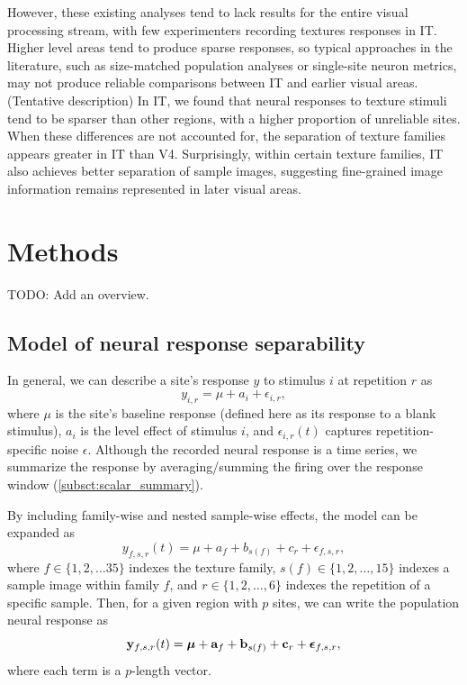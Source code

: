 \documentclass[draft]{cmustatproposal} %
\newcommand{\todo}[1]{{\color{purple}#1}}
\begin{document}
However, these existing analyses tend to lack results for the entire visual processing stream, with few experimenters recording textures responses in IT. Higher level areas tend to produce sparse responses, so typical approaches in the literature, such as size-matched population analyses or single-site neuron metrics, may not produce reliable comparisons between IT and earlier visual areas. \todo{(Tentative description) In IT, we found that neural responses to texture stimuli tend to be sparser than other regions, with a higher proportion of unreliable sites. When these differences are not accounted for, the separation of texture families appears greater in IT than V4. Surprisingly, within certain texture families, IT also achieves better separation of sample images, suggesting fine-grained image information remains represented in later visual areas.}

\section{Methods}

\todo{TODO: Add an overview.}

\subsection{Model of neural response separability}
In general, we can describe a site's response \( y \) to stimulus \( i \) at repetition \( r \) as 
\[ y_{i, r} = \mu + a_{i} + \epsilon_{i, r}, \]
where \( \mu \) is the site's baseline response (defined here as its response to a blank stimulus), \( a_i \) is the level effect of stimulus \( i \), and \( \epsilon_{i, r} (t) \) captures repetition-specific noise \( \epsilon \). \todo{Although the recorded neural response is a time series, we summarize the response by averaging/summing the firing over the response window (\ref{subsct:scalar_summary}).} 

By including family-wise and nested sample-wise effects, the model can be expanded as
\begin{equation}
\label{eqn:model}
y_{f, s, r} (t) = \mu + a_{f} + b_{s(f)} + c_r + \epsilon_{f, s, r},
\end{equation}
where \( f \in \{ 1, 2, \dots 35 \} \) indexes the texture family, \( s (f) \in \{ 1, 2, \dots, 15 \} \) indexes a sample image within family \( f \), and \( r \in \{ 1, 2, \dots, 6 \} \) indexes the repetition of a specific sample. Then, for a given region with \( p \) sites, we can write the population neural response as 
\begin{equation}
\label{eqn:model}
\mathbf{y}_{f, s, r} (t) = \boldsymbol{ \mu } + \mathbf{a}_{f} + \mathbf{b}_{s(f)} + \mathbf{c}_r + \boldsymbol{ \epsilon }_{f, s, r}, 
\end{equation}
where each term is a \( p \)-length vector. 
\end{document}
